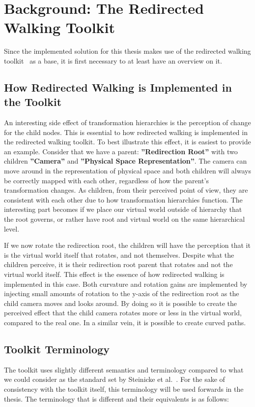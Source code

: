 \section{Background: The Redirected Walking Toolkit}
Since the implemented solution for this thesis makes use of the redirected walking toolkit~\cite{azmandian2016redirected} as a base, it is first necessary to at least have an overview on it. 

\subsection{How Redirected Walking is Implemented in the Toolkit}
An interesting side effect of transformation hierarchies is the perception of change for the child nodes. This is essential to how redirected walking is implemented in the redirected walking toolkit. To best illustrate this effect, it is easiest to provide an example. Consider that we have a parent: \textbf{''Redirection Root''} with two children \textbf{''Camera''} and \textbf{''Physical Space Representation''}. The camera can move around in the representation of physical space and both children will always be correctly mapped with each other, regardless of how the parent's transformation changes. As children, from their perceived point of view, they are consistent with each other due to how transformation hierarchies function. The interesting part becomes if we place our virtual world outside of hierarchy that the root governs, or rather have root and virtual world on the same hierarchical level. 

If we now rotate the redirection root, the children will have the perception that it is the virtual world itself that rotates, and not themselves. Despite what the children perceive, it is their redirection root parent that rotates and not the virtual world itself. This effect is the essence of how redirected walking is implemented in this case. Both curvature and rotation gains are implemented by injecting small amounts of rotation to the y-axis of the redirection root as the child camera moves and looks around. By doing so it is possible to create the perceived effect that the child camera rotates more or less in the virtual world, compared to the real one. In a similar vein, it is possible to create curved paths. 

\subsection{Toolkit Terminology}
The toolkit uses slightly different semantics and terminology compared to what we could consider as the standard set by Steinicke et al.~\cite{5072212}. For the sake of consistency with the toolkit itself, this terminology will be used forwards in the thesis. The terminology that is different and their equivalents is as follows:

